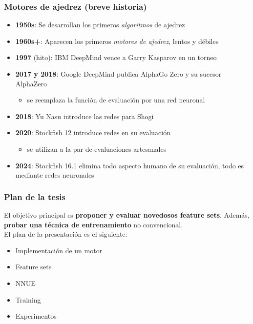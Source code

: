 \begin{frame}
\frametitle{Motores de ajedrez (breve historia)}
\begin{itemize}
    \item<1-> \textbf{1950s}: Se desarrollan los primeros \textit{algoritmos} de ajedrez
    \item<2-> \textbf{1960s+}: Aparecen los primeros \textit{motores de ajedrez}, lentos y débiles
    \item<3-> \textbf{1997} (hito): IBM DeepMind vence a Garry Kasparov en un torneo
    \item<4-> \textbf{2017 y 2018}: Google DeepMind publica AlphaGo Zero y su sucesor AlphaZero
    \begin{itemize}
        \item se reemplaza la función de evaluación por una red neuronal
    \end{itemize}
    \item<5-> \textbf{2018}: Yu Nasu introduce las redes  para Shogi
    \item<6-> \textbf{2020}: Stockfish 12 introduce redes  en su evaluación
    \begin{itemize}
        \item se utilizan a la par de evaluaciones artesanales
    \end{itemize}
    \item<7-> \textbf{2024}: Stockfish 16.1 elimina todo aspecto humano de su evaluación, todo es mediante redes neuronales
\end{itemize}
\end{frame}

\begin{frame}
\frametitle{Plan de la tesis}
El objetivo principal es \textbf{proponer y evaluar novedosos feature sets}. \pause Además, \textbf{probar una técnica de entrenamiento} no convencional. \\
\pause
\vspace{1em}
El plan de la presentación es el siguiente:
\begin{itemize}
\item<3-> Implementación de un motor
\item<4-> Feature sets
\item<5-> NNUE
\item<6-> Training
\item<7-> Experimentos
\end{itemize}
\end{frame}


